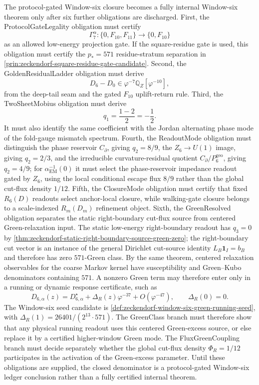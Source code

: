 \begin{principle}
\label{prin:zeckendorf-unclosed-denominator-obligations}
The protocol-gated Window-six closure becomes a fully internal
Window-six theorem only after six further obligations are discharged.
First, the ProtocolGateLegality obligation must certify
$$
  \Gamma^\alpha_7:
  \{0,F_{10},F_{11}\}\to\{0,F_{10}\}
$$
as an allowed low-energy projection gate. If the square-residue gate is
used, this obligation must certify the \(p_\ast=571\) residue-stratum
separation in \autoref{prin:zeckendorf-square-residue-gate-candidate}.
Second, the GoldenResidualLadder obligation must derive
$$
  D_6-D_0\in\varphi^{-7}\mathbb{Q}_{Z}[\varphi^{-10}],
$$
from the deep-tail seam and the gated \(F_{10}\) uplift-return rule.
Third, the TwoSheetMobius obligation must derive
$$
  q_1=\frac{1-2}{2}=-\frac12.
$$
It must also identify the same coefficient with the Jordan alternating
phase mode of the fold-gauge mismatch spectrum. Fourth, the ReadoutMode
obligation must distinguish the phase reservoir
\(C_\partial\), giving \(q_2=8/9\), the \(Z_6\to U(1)\) image, giving
\(q_2=2/3\), and the irreducible curvature-residual quotient
\(C_\partial/P_6^{\mathrm{geo}}\), giving \(q_2=4/9\); for
\(\alpha_{\mathrm{EM}}^{-1}(0)\) it must select the phase-reservoir
impedance readout gated by \(Z_6\), using the local conditional escape
flux \(8/9\) rather than the global cut-flux density \(1/12\). Fifth,
the ClosureMode obligation
must certify that fixed
\(R_6(D)\) readouts select anchor-local closure, while walking-gate
closure belongs to a scale-indexed \(R_m(D_m)\) refinement object. Sixth,
the GreenResolved obligation separates the static right-boundary cut-flux
source from centered Green-relaxation input. The static low-energy
right-boundary readout has $q_3=0$ by
\autoref{thm:zeckendorf-static-right-boundary-source-green-zero}; the
right-boundary cut vector is an instance of the general Dirichlet
cut-source identity $L_B\mathbf{1}_I=b_B$ and therefore has zero
$571$-Green class. By the same theorem, centered relaxation observables
for the coarse Markov kernel have susceptibility and Green--Kubo
denominators containing $571$. A nonzero Green term may therefore enter
only in a running or dynamic response certificate, such as
$$
  D_{6,\alpha}(z)
  =
  D_{6,\alpha}^{\star}
  +
  \Delta_R(z)\varphi^{-37}
  +
  O(\varphi^{-47}),
  \qquad
  \Delta_R(0)=0.
$$
The Window-six seed candidate is
\autoref{def:zeckendorf-window-six-green-running-seed}, with
$\Delta_R(1)=26401/(2^{13}\cdot571)$. The GreenClass branch must
therefore show that any physical running readout uses this centered
Green-excess source, or else replace it by a certified higher-window
Green mode. The FluxGreenCoupling branch must decide separately whether
the global cut-flux density $\Phi_R=1/12$ participates in the activation
of the Green-excess parameter. Until these obligations are supplied, the
closed denominator is a
protocol-gated Window-six ledger conclusion rather than a fully certified
internal theorem.
\end{principle}

